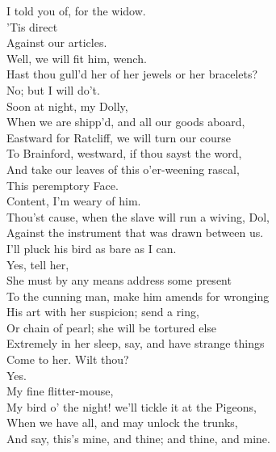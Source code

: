 \documentclass[a4paper,oneside]{memoir}
\begin{document}
\begin{drama*}
I told you of, for the widow.\\
\dolspeaks {} 'Tis direct\\
Against our articles.\\
\subtlespeaks {} Well, we will fit him, wench.\\
Hast thou gull'd her of her jewels or her bracelets?\\
\dolspeaks No; but I will do't.\\
\subtlespeaks {} Soon at night, my Dolly,\\
When we are shipp'd, and all our goods aboard,\\
Eastward for Ratcliff, we will turn our course\\
To Brainford, westward, if thou sayst the word,\\
And take our leaves of this o'er-weening rascal,\\
This peremptory Face.\\
\dolspeaks {} Content, I'm weary of him.\\
\subtlespeaks Thou'st cause, when the slave will run a wiving, Dol,\\
Against the instrument that was drawn between us.\\
\dolspeaks I'll pluck his bird as bare as I can.\\
\subtlespeaks {} Yes, tell her,\\
She must by any means address some present\\
To the cunning man, make him amends for wronging\\
His art with her suspicion; send a ring,\\
Or chain of pearl; she will be tortured else\\
Extremely in her sleep, say, and have strange things\\
Come to her. Wilt thou?\\
\dolspeaks {} Yes.\\
\subtlespeaks {} My fine flitter-mouse,\\
My bird o' the night! we'll tickle it at the Pigeons,\\
When we have all, and may unlock the trunks,\\
And say, this's mine, and thine; and thine, and mine.\\

\end{drama*}
\end{document}
